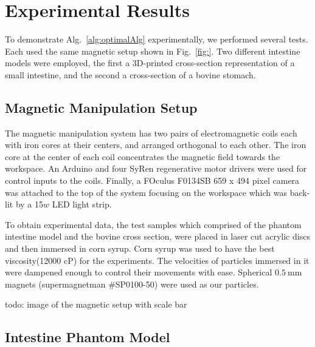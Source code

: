 \section{Experimental Results}\label{sec:expResults}

To demonstrate Alg.~\ref{alg:optimalAlg} experimentally, we performed several tests.
Each used the same magnetic setup shown in Fig.~\ref{fig:}.
 Two different intestine models were employed, the first a 3D-printed cross-section representation of a small intestine, and the second a cross-section of a bovine stomach.
 
 \subsection{Magnetic Manipulation Setup}
 
 The magnetic manipulation system has two pairs of electromagnetic coils each with iron cores at their centers, and arranged orthogonal to each other. The iron core at the center of each coil concentrates the magnetic field towards the workspace. An Arduino and four SyRen regenerative motor drivers were used for control inputs to the coils. Finally, a FOculus F0134SB 659 x 494 pixel camera was attached to the top of the system focusing on the workspace which was back-lit by a 15$w$ LED light strip. 
 
To obtain experimental data, the test samples which comprised of the phantom intestine model and the bovine cross section, were placed in laser cut acrylic discs and then immersed in corn syrup. Corn syrup was used to have the best viscosity(12000 cP) for the experiments. The velocities of particles immersed in it were dampened enough to control their movements with ease. Spherical $\SI{0.5}{\milli\metre}$ magnets (supermagnetman \#SP0100-50) were used as our particles.
 

todo: image of the magnetic setup with scale bar


\subsection{Intestine Phantom Model}

